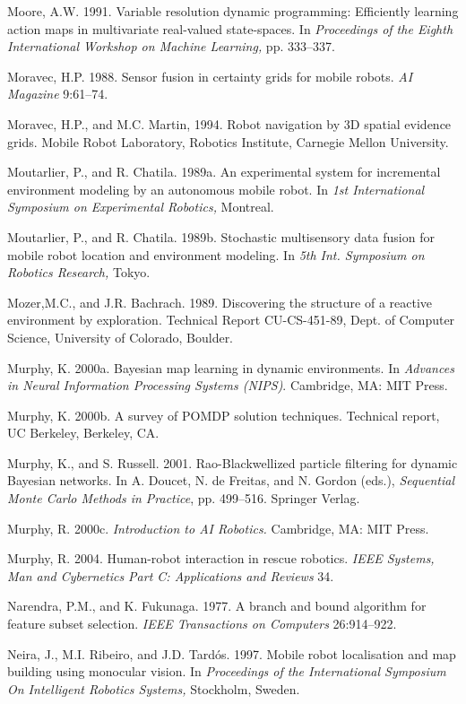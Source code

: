 \documentclass[10pt,a4paper]{article}
\begin{document}
Moore, A.W. 1991. Variable resolution dynamic programming: Efficiently learning
action maps in multivariate real-valued state-spaces. In \textit{Proceedings of the Eighth
International Workshop on Machine Learning,} pp. 333–337.

Moravec, H.P. 1988. Sensor fusion in certainty grids for mobile robots. \textit{AI Magazine}
9:61–74.

Moravec, H.P., and M.C. Martin, 1994. Robot navigation by 3D spatial evidence grids.
Mobile Robot Laboratory, Robotics Institute, Carnegie Mellon University.

Moutarlier, P., and R. Chatila. 1989a. An experimental system for incremental environment
modeling by an autonomous mobile robot. In \textit{1st International Symposium
on Experimental Robotics,} Montreal.

Moutarlier, P., and R. Chatila. 1989b. Stochastic multisensory data fusion for mobile
robot location and environment modeling. In \textit{5th Int. Symposium on Robotics
Research,} Tokyo.

Mozer,M.C., and J.R. Bachrach. 1989. Discovering the structure of a reactive environment
by exploration. Technical Report CU-CS-451-89, Dept. of Computer Science,
University of Colorado, Boulder.

Murphy, K. 2000a. Bayesian map learning in dynamic environments. In \textit{Advances in
Neural Information Processing Systems (NIPS)}. Cambridge, MA: MIT Press.

Murphy, K. 2000b. A survey of POMDP solution techniques. Technical report, UC
Berkeley, Berkeley, CA.

Murphy, K., and S. Russell. 2001. Rao-Blackwellized particle filtering for dynamic
Bayesian networks. In A. Doucet, N. de Freitas, and N. Gordon (eds.), \textit{Sequential
Monte Carlo Methods in Practice}, pp. 499–516. Springer Verlag.

Murphy, R. 2000c. \textit{Introduction to AI Robotics.} Cambridge, MA: MIT Press.

Murphy, R. 2004. Human-robot interaction in rescue robotics. \textit{IEEE Systems, Man and
Cybernetics Part C: Applications and Reviews} 34.

Narendra, P.M., and K. Fukunaga. 1977. A branch and bound algorithm for feature
subset selection. \textit{IEEE Transactions on Computers} 26:914–922.

Neira, J., M.I. Ribeiro, and J.D. Tardós. 1997. Mobile robot localisation and map
building using monocular vision. In \textit{Proceedings of the International Symposium On
Intelligent Robotics Systems,} Stockholm, Sweden.
\end{document}
